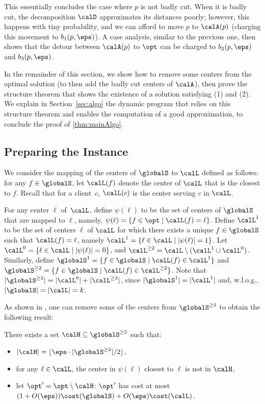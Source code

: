 This essentially concludes the case where $p$ is not badly cut. When it is badly cut, the decomposition $\calD$ approximates its distances poorly; however, this happens with tiny probability, and we can afford to move $p$ to $\calA(p)$ (charging this movement to $b_1(p, \eps)$). A case analysis, similar to the previous one, then shows that the detour between $\calA(p)$ to $\opt$ can be charged to $b_2(p, \eps)$ and $b_3(p, \eps)$.

In the remainder of this section, we show how to remove some centers from the optimal solution (to then add the badly cut centers of $\calA$), then prove the structure theorem that shows the existence of a solution satisfying (1) and (2). 
We explain in Section~\ref{sec:algo} the dynamic program that relies on this structure theorem and enables the computation of a good approximation, to conclude the proof of \cref{thm:mainAlgo}.

\subsection{Preparing the Instance}\label{sec:prepareInstance}
We consider the mapping of the
centers of $\globalS$ to $\calL$ defined as follows: for 
any $f \in \globalS$, let $\calL(f)$  denote the center of $\calL$ that is the closest 
to $f$. Recall that for a client~$c$, $\calL(c)$ is the center serving $c$ in $\calL$.

For any center $\ell$ of~$\calL$, define $\psi(\ell)$ to be the set of centers 
of $\globalS$ that are mapped to $\ell$, namely, $\psi(\ell) = \{f \in \opt \mid 
\calL(f) = \ell \}$. 
Define $ \calL^1$ to be the set of centers $\ell$ of $\calL$ for 
which there exists a unique $f \in \globalS$ such that $\calL(f) = \ell$, namely 
$ \calL^1 = \{\ell\in \calL \mid |\psi(\ell)| = 1\}$. Let $ \calL^0 = \{ \ell\in \calL \mid 
|\psi(\ell)| = 
0\}$, and $ \calL^{\geq 2} = \calL \setminus( \calL^1 \cup \calL^0)$. 
Similarly, define 
$\globalS^1 = \{f \in \globalS \mid \calL(f) \in \calL^1\}$ 
 and $\globalS^{\geq 2} = \{ f \in \globalS \mid 
\calL(f) \in \calL^{\geq 2}\}$. Note that $|\globalS^{\geq 2}| = | \calL^0|+| \calL^{\geq 2}|$, since 
$|\globalS^1|=| \calL^1|$ and, w.l.o.g., $|\globalS|=| \calL|=k$.

As shown in \cite{jacm}, one can remove some of the centers from $\globalS^{\geq 2}$ to obtain the following result:
\begin{lemma}\label{lem:coststep1}
There exists a set $\calH \subseteq \globalS^{\geq 2}$ such that: 
\begin{itemize}
    \item $|\calH| = \lfloor \eps\cdot  |\globalS^{\geq 2}| / 2\rfloor$,
    \item for any $\ell \in \calL$, the center in $\psi(\ell)$ closest to $\ell$ is not in $\calH$, 
    \item let $\opt' = \opt \setminus \calH$: $\opt'$ has cost at most $(1+O(\eps))\cost(\globalS) + O(\eps)\cost( \calL)$.
\end{itemize}
\end{lemma}



